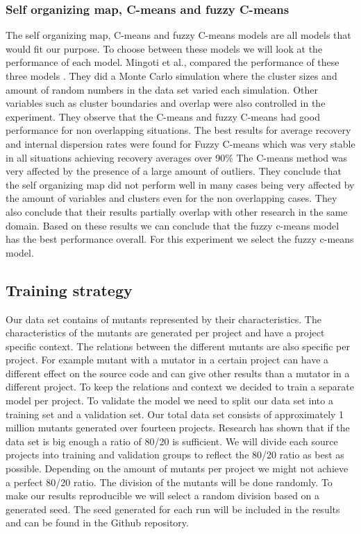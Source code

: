 \documentclass[../../main]{subfiles}
\begin{document}
\subsubsection{Self organizing map, C-means and fuzzy C-means}
The self organizing map, C-means and fuzzy C-means models are all models that would fit our purpose. 
To choose between these models we will look at the performance of each model.
Mingoti et al., compared the performance of these three models \cite{Mingoti2006ComparingAlgorithms}.
They did a Monte Carlo simulation where the cluster sizes and amount of random numbers in the data set varied each simulation\cite{Mingoti2006ComparingAlgorithms}.
Other variables such as cluster boundaries and overlap were also controlled in the experiment.
They observe that the C-means and fuzzy C-means had good performance for non overlapping situations\cite{Mingoti2006ComparingAlgorithms}.
The best results for average recovery and internal dispersion rates were found for Fuzzy C-means which was very stable in all situations achieving recovery averages over 90\%\cite{Mingoti2006ComparingAlgorithms}
The C-means method was very affected by the presence of a large amount of outliers.
They conclude that the self organizing map did not perform well in many cases being very affected by the amount of variables and clusters even for the non overlapping cases\cite{Mingoti2006ComparingAlgorithms}.
They also conclude that their results partially overlap with other research in the same domain.
\newline
Based on these results we can conclude that the fuzzy c-means model has the best performance overall.
For this experiment we select the fuzzy c-means model.

\subsection{Training strategy}
\label{ch:training_strategy}
Our data set contains of mutants represented by their characteristics. 
The characteristics of the mutants are generated per project and have a project specific context.
The relations between the different mutants are also specific per project.
For example mutant with a mutator in a certain project can have a different effect on the source code and can give other results than a mutator in a different project.
To keep the relations and context we decided to train a separate model per project.
\newline
To validate the model we need to split our data set into a training set and a validation set.
Our total data set consists of approximately 1 million mutants generated over fourteen projects.
Research has shown that if the data set is big enough a ratio of 80/20 is sufficient\cite{Guyon1997ARatio}.
We will divide each source projects into training and validation groups to reflect the 80/20 ratio as best as possible.
Depending on the amount of mutants per project we might not achieve a perfect 80/20 ratio.
The division of the mutants will be done randomly. 
To make our results reproducible we will select a random division based on a generated seed.
The seed generated for each run will be included in the results and can be found in the Github repository\cite{rbasarat-repo}.
\end{document}
